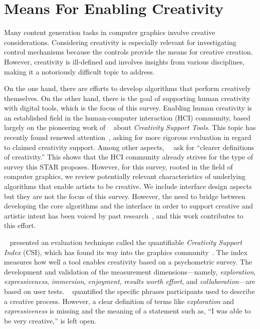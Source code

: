 

\section{Means For Enabling Creativity}\label{sec:creativ_means}

Many content generation tasks in computer graphics involve creative considerations. Considering creativity is especially relevant for investigating control mechanisms because the controls provide the means for creative creation. However, creativity is ill-defined and involves insights from various disciplines, making it a notoriously difficult topic to address.

On the one hand, there are efforts to develop algorithms that perform creatively themselves. On the other hand, there is the goal of supporting human creativity with digital tools, which is the focus of this survey. Enabling human creativity is an established field in the human-computer interaction (HCI) community, based largely on the pioneering work of \citeauthor*{shneiderman_2007_cst}~\cite{shneiderman_2007_cst} about \textit{Creativity Support Tools}. This topic has recently found renewed attention~\cite{frich_2018_tyo, frich_2019_mtl, remy_2020_ecs}, asking for more rigorous evaluation in regard to claimed creativity support. Among other aspects,~\citeauthor*{frich_2018_tyo}~\cite{frich_2018_tyo} ask for ``clearer definitions of creativity.'' This shows that the HCI community already strives for the type of survey this STAR proposes. However, for this survey, rooted in the field of computer graphics, we review potentially relevant characteristics of underlying algorithms that enable artists to be creative. We include interface design aspects but they are not the focus of this survey. However, the need to bridge between developing the core algorithms and the interface in order to support creative and artistic intent has been voiced by past research~\cite{deterding_2017_mci,isenberg_2016_inw, salesin_2002_nar}, and this work contributes to this effort.

\citeauthor*{cherry_2014_qcs}~\cite{cherry_2014_qcs} presented an evaluation technique called the quantifiable \textit{Creativity Support Index} (CSI), which has found its way into the graphics community~\cite{shugrina_2017_ppi}. The index measures how well a tool enables creativity based on a psychometric survey. The development and validation of the measurement dimensions---namely, \textit{exploration}, \textit{expressiveness}, \textit{immersion}, \textit{enjoyment}, \textit{results worth effort}, and \textit{collaboration}---are based on user tests. \citeauthor*{cherry_2014_qcs}~\cite{cherry_2014_qcs} quantified the specific phrases participants used to describe a creative process. However, a clear definition of terms like \textit{exploration} and \textit{expressiveness} is missing and the meaning of a statement such as, ``I was able to be very creative,'' is left open. 

